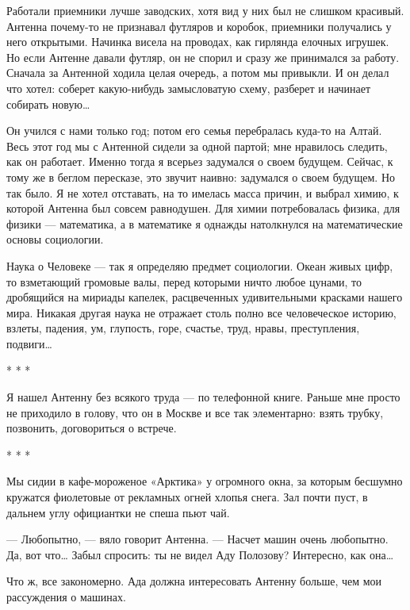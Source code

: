    Работали приемники  лучше  заводских,  хотя  вид  у  них  был  не  слишком
   красивый. Антенна  почему-то не  признавал футляров  и коробок,  приемники
   получались у  него открытыми.  Начинка висела  на проводах,  как  гирлянда
   елочных игрушек. Но если  Антенне давали футляр, он  не спорил и сразу  же
   принимался за работу. Сначала за Антенной ходила целая очередь, а потом мы
   привыкли. И он делал что  хотел: соберет какую-нибудь замысловатую  схему,
   разберет и начинает собирать новую…

   Он учился с нами только год; потом его семья перебралась куда-то на Алтай.
   Весь этот год мы с Антенной сидели за одной партой; мне нравилось следить,
   как он работает. Именно тогда я всерьез задумался о своем будущем. Сейчас,
   к тому  же  в беглом  пересказе,  это  звучит наивно:  задумался  о  своем
   будущем. Но так было. Я не хотел отставать, на то имелась масса причин,  и
   выбрал  химию,  к  которой  Антенна  был  совсем  равнодушен.  Для   химии
   потребовалась физика, для физики  — математика, а  в математике я  однажды
   натолкнулся на математические основы социологии.

   Наука о Человеке — так я  определяю предмет социологии. Океан живых  цифр,
   то взметающий  громовые  валы,  перед  которыми  ничто  любое  цунами,  то
   дробящийся на мириады капелек, расцвеченных удивительными красками  нашего
   мира. Никакая  другая  наука  не отражает  столь  полно  все  человеческое
   историю, взлеты,  падения,  ум,  глупость,  горе,  счастье,  труд,  нравы,
   преступления, подвиги…

                                     * * *

   Я нашел Антенну без всякого труда — по телефонной книге. Раньше мне просто
   не приходило  в голову,  что он  в  Москве и  все так  элементарно:  взять
   трубку, позвонить, договориться о встрече.

                                     * * *

   Мы сидии в кафе-мороженое «Арктика» у огромного окна, за которым  бесшумно
   кружатся фиолетовые от  рекламных огней  хлопья снега. Зал  почти пуст,  в
   дальнем углу официантки не спеша пьют чай.

   — Любопытно, — вяло говорит Антенна.  — Насчет машин очень любопытно.  Да,
   вот что… Забыл спросить: ты не видел Аду Полозову? Интересно, как она…

   Что ж, все закономерно.  Ада должна интересовать  Антенну больше, чем  мои
   рассуждения о машинах.

